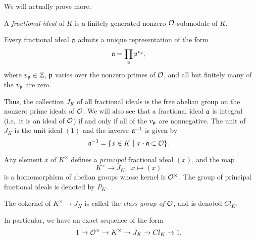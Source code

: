 We will actually prove more.
\begin{definition}
  A \emph{fractional ideal} of $K$ is a finitely-generated nonzero $\mathcal{O}$-submodule of $K$.
\end{definition}

\begin{theorem}
  Every fractional ideal $\mathfrak{a}$ admits a unique representation of the form
  \[ \mathfrak{a} = \prod_{\mathfrak{p}} \mathfrak{p}^{v_{\mathfrak{p}}}, \]
  where $v_{\mathfrak{p}} \in \mathbb{Z}$, $\mathfrak{p}$ varies over the nonzero primes of $\mathcal{O}$, and all but finitely many of the $v_{\mathfrak{p}}$ are zero.
\end{theorem}

Thus, the collection $J_{K}$ of all fractional ideals is the free abelian group on the nonzero prime ideals of $\mathcal{O}$.
We will also see that a fractional ideal $\mathfrak{a}$ is integral (i.e.~it is an ideal of $\mathcal{O}$) if and only if all of the $v_{\mathfrak{p}}$ are nonnegative.
The unit of $J_{K}$ is the unit ideal $(1)$ and the inverse $\mathfrak{a}^{-1}$ is given by
\[ \mathfrak{a}^{-1} = \{x \in K \ | \ x \cdot \mathfrak{a} \subset \mathcal{O} \}. \]

Any element $x$ of $K^{\times}$ defines a \emph{principal} fractional ideal $(x)$, and the map
\[ K^{\times} \to J_{K}, \ \ x \mapsto (x) \]
is a homomorphism of abelian groups whose kernel is $\mathcal{O}^{\times}$.
The group of principal fractional ideals is denoted by $P_{K}$.
\begin{definition}
  The cokernel of $K^{\times} \to J_{K}$ is called the \emph{class group of $\mathcal{O}$}, and is denoted $Cl_{K}$.
\end{definition}
In particular, we have an exact sequence of the form
\[ 1 \to \mathcal{O}^{\times} \to K^{\times} \to J_{K} \to Cl_{K} \to 1. \]


